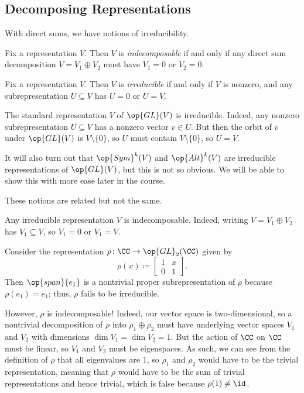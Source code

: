 \documentclass[../notes.tex]{subfiles}
\begin{document}
\subsection{Decomposing Representations}
With direct sums, we have notions of irreducibility.
\begin{definition}[indecomposable]
	Fix a representation $V$. Then $V$ is \textit{indecomposable} if and only if any direct sum decomposition $V=V_1\oplus V_2$ must have $V_1=0$ or $V_2=0$.
\end{definition}
\begin{definition}[irreducible]
	Fix a representation $V$. Then $V$ is \textit{irreducible} if and only if $V$ is nonzero, and any subrepresentation $U\subseteq V$ has $U=0$ or $U=V$.
\end{definition}
\begin{example}
	The standard representation $V$ of $\op{GL}(V)$ is irreducible. Indeed, any nonzero subrepresentation $U\subseteq V$ has a nonzero vector $v\in U$. But then the orbit of $v$ under $\op{GL}(V)$ is $V\setminus\{0\}$, so $U$ must contain $V\setminus\{0\}$, so $U=V$.

	It will also turn out that $\op{Sym}^k(V)$ and $\op{Alt}^k(V)$ are irreducible representations of $\op{GL}(V)$, but this is not so obvious. We will be able to show this with more ease later in the course.
\end{example}
These notions are related but not the same.
\begin{remark}
	Any irreducible representation $V$ is indecomposable. Indeed, writing $V=V_1\oplus V_2$ has $V_1\subseteq V$, so $V_1=0$ or $V_1=V$.
\end{remark}
\begin{example}
	Consider the representation $\rho\colon\CC\to\op{GL}_2(\CC)$ given by
	\[\rho(x)\coloneqq\begin{bmatrix}
		1 & x \\ 0 & 1
	\end{bmatrix}.\]
	Then $\op{span}\{e_1\}$ is a nontrivial proper subrepresentation of $\rho$ because $\rho(e_1)=e_1$; thus, $\rho$ fails to be irreducible.
	
	However, $\rho$ is indecomposable! Indeed, our vector space is two-dimensional, so a nontrivial decomposition of $\rho$ into $\rho_1\oplus\rho_2$ must have underlying vector spaces $V_1$ and $V_2$ with dimensions $\dim V_1=\dim V_2=1$. But the action of $\CC$ on $\CC$ must be linear, so $V_1$ and $V_2$ must be eigenspaces. As such, we can see from the definition of $\rho$ that all eigenvalues are $1$, so $\rho_1$ and $\rho_2$ would have to be the trivial representation, meaning that $\rho$ would have to be the sum of trivial representations and hence trivial, which is false because $\rho(1)\ne\id$.
\end{example}
\end{document}
